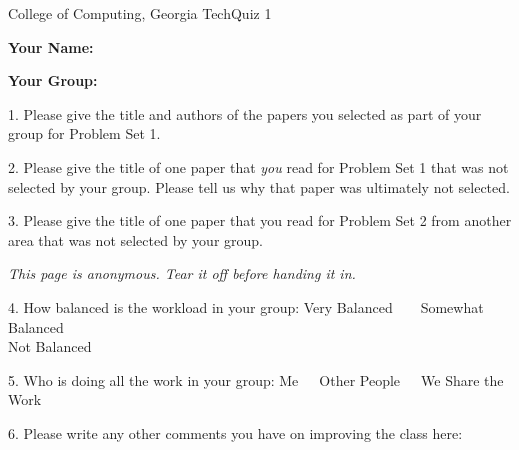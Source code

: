 \documentclass[11pt]{article}
\begin{document}


{College of Computing, Georgia Tech}{Quiz 1}

{\bf Your Name:}

{\bf Your Group:}


1. Please give the title and authors of the papers you selected as part
   of your group for Problem Set 1.

\vspace*{2 in}


2. Please give the title of one paper that {\em you} read for Problem
   Set 1 that was not selected by your group.  Please tell us why that
   paper was ultimately not selected.

\vspace*{2 in}

3. Please give the title of one paper that you read for Problem Set 2
   from another area that was not selected by your group.


\pagebreak

{\em This page is anonymous.  Tear it off before handing it in.}

4. How balanced is the workload in your group:  Very Balanced~~~~Somewhat
   Balanced \\ Not Balanced

\vspace*{2 in}


5. Who is doing all the work in your group:  Me~~~Other People~~~We
   Share the Work

\vspace*{2 in}

6. Please write any other comments you have on improving the class here:
\end{document}

